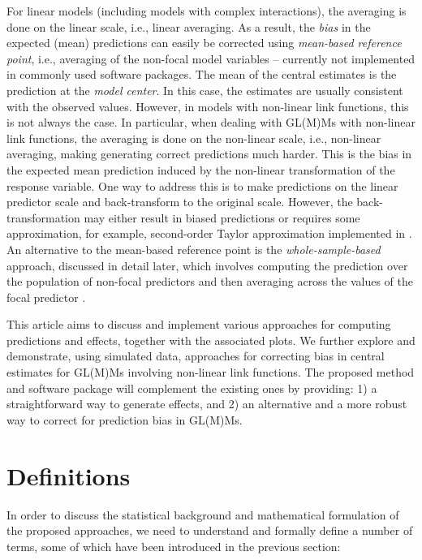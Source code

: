 For linear models (including models with complex interactions), the averaging is done on the linear scale, i.e., linear averaging. As a result, the \emph{bias} in the expected (mean) predictions can easily be corrected using \emph{mean-based reference point}, i.e., averaging of the non-focal model variables -- currently not implemented in commonly used  software packages. The mean of the central estimates is the prediction at the \emph{model center}. In this case, the estimates are usually consistent with the observed values. However, in models with non-linear link functions, this is not always the case. In particular, when dealing with GL(M)Ms with non-linear link functions, the averaging is done on the non-linear scale, i.e., non-linear averaging, making generating correct predictions much harder. This is the bias in the expected mean prediction induced by the non-linear transformation of the response variable. One way to address this is to make predictions on the linear predictor scale and back-transform to the original scale. However, the back-transformation may either result in biased predictions or requires some approximation, for example, second-order Taylor approximation implemented in  \citep{lenth2018package}. An alternative to the mean-based reference point is the \emph{whole-sample-based} approach, discussed in detail later, which involves computing the prediction over the population of non-focal predictors and then averaging across the values of the focal predictor \citep{hanmer2013behind}. 

This article aims to discuss and implement various approaches for computing predictions and effects, together with the associated plots. We further explore and demonstrate, using simulated data, approaches for correcting bias in central estimates for GL(M)Ms involving non-linear link functions. The proposed method and  software package will complement the existing ones by providing: 1) a straightforward way to generate effects, and 2) an alternative and a more robust way to correct for prediction bias in GL(M)Ms.

\section{Definitions}

In order to discuss the statistical background and mathematical formulation of the proposed approaches, we need to understand and formally define a number of terms, some of which have been introduced in the previous section:

